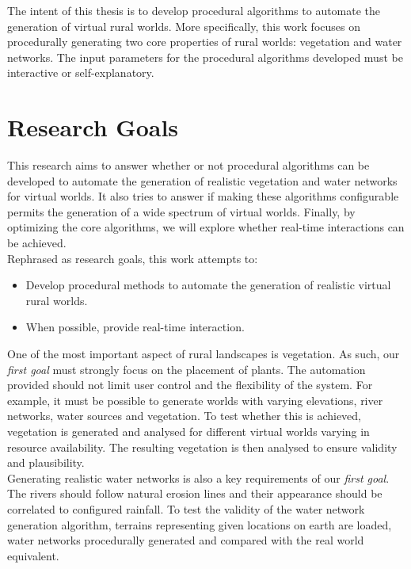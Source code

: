 The intent of this thesis is to develop procedural algorithms to automate the generation of virtual rural worlds. More specifically, this work focuses on procedurally generating two core properties of rural worlds: vegetation and water networks. The input parameters for the procedural algorithms developed must be interactive or self-explanatory. 

\newpage
\section{Research Goals}

This research aims to answer whether or not procedural algorithms can be developed to automate the generation of realistic vegetation and water networks for virtual worlds. It also tries to answer if making these algorithms configurable permits the generation of a wide spectrum of virtual worlds. Finally, by optimizing the core algorithms, we will explore whether real-time interactions can be achieved. \\

Rephrased as research goals, this work attempts to:
\begin{itemize}
\item Develop procedural methods to automate the generation of realistic virtual rural worlds.
\item When possible, provide real-time interaction.
\end{itemize}

One of the most important aspect of rural landscapes is vegetation. As such, our \textit{first goal} must strongly focus on the placement of plants. The automation provided should not limit user control and the flexibility of the system. For example, it must be possible to generate worlds with varying elevations, river networks, water sources and vegetation. To test whether this is achieved, vegetation is generated and analysed for different virtual worlds varying in resource availability. The resulting vegetation is then analysed to ensure validity and plausibility. \\

Generating realistic water networks is also a key requirements of our \textit{first goal}. The rivers should follow natural erosion lines and their appearance should be correlated to configured rainfall. To test the validity of the water network generation algorithm, terrains representing given locations on earth are loaded, water networks procedurally generated and compared with the real world equivalent. \\


